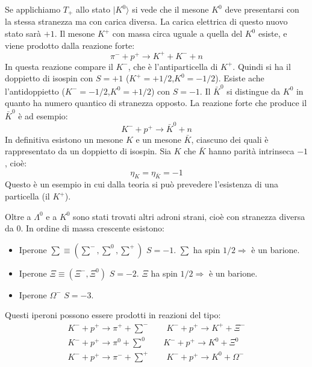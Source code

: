 Se applichiamo $T_+$ allo stato $|K^0\rangle$ si vede che il mesone $K^0$ deve presentarsi con la stessa
stranezza ma con carica diversa.
La carica elettrica di questo nuovo stato sarà $+1$. Il mesone $K^+$ con massa circa uguale a quella del $K^0$
esiste, e viene prodotto dalla reazione forte:
\[
\pi^-+p^+\rightarrow K^++K^-+n
\]
In questa reazione compare il $K^-$, che è l'antiparticella di $K^+$.
Quindi si ha il doppietto di isospin con $S=+1$ ($K^+=+1/2$,$K^0=-1/2$).
Esiste ache l'antidoppietto ($K^-=-1/2$,$K^0=+1/2$) con $S=-1$. Il $\bar{K}^0$ si distingue da $K^0$ in quanto ha
numero quantico di stranezza opposto. La reazione forte che produce il $\bar{K}^0$ è ad esempio:
\begin{equation}
K^-+p^+\rightarrow \bar{K}^0+n
\end{equation}
In definitiva esistono un mesone $K$ e un mesone $\bar{K}$, ciascuno dei quali è rappresentato da un doppietto di isospin.
Sia $K$ che $\bar{K}$ hanno parità intrinseca $-1$, cioè:
\begin{equation}
\eta_{K}=\eta_{\bar{K}}=-1
\end{equation}
Questo è un esempio in cui dalla teoria si può prevedere l'esistenza di una particella (il $K^+$).

Oltre a $\Lambda^0$ e a $K^0$ sono stati trovati altri adroni strani, cioè con stranezza diversa da $0$. In ordine
di massa crescente esistono:
\begin{itemize}
\item Iperone $\sum\equiv (\sum^-,\sum^0,\sum^+)$ $S=-1$. $\sum$ ha spin $1/2\Rightarrow$ è un barione.
\item Iperone $\Xi\equiv (\Xi^-,\Xi^0)$ $S=-2$. $\Xi$ ha spin $1/2\Rightarrow$ è un barione.
\item Iperone $\Omega^-$ $S=-3$.
\end{itemize}

Questi iperoni possono essere prodotti in reazioni del tipo:
\begin{gather}
K^-+p^+\rightarrow \pi^++\sum^-\qquad K^-+p^+\rightarrow K^++\Xi^-\\
K^-+p^+\rightarrow \pi^0+\sum^0\qquad K^-+p^+\rightarrow K^0+\Xi^0\\
K^-+p^+\rightarrow \pi^-+\sum^+\qquad K^-+p^+\rightarrow K^0+\Omega^-
\end{gather}

